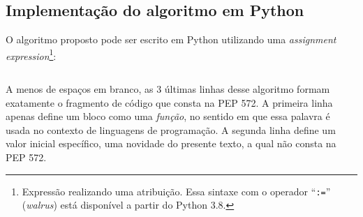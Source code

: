 \subsection*{Implementação do algoritmo em Python}

O algoritmo proposto pode ser escrito em Python
utilizando uma \emph{assignment expression}\footnote{
  Expressão realizando uma atribuição.
  Essa sintaxe com o operador ``\texttt{:=}'' (\emph{walrus})
  está disponível a partir do Python 3.8.
}:

\begin{center}
  \begin{minipage}{7cm}
    \inputminted{python}{nth_root.py}
  \end{minipage}
\end{center}

A menos de espaços em branco,
as $3$ últimas linhas desse algoritmo
formam exatamente o fragmento de código que consta na PEP 572.
A primeira linha apenas define um bloco como uma \emph{função},
no sentido em que essa palavra é usada
no contexto de linguagens de programação.
A segunda linha define um valor inicial específico,
uma novidade do presente texto, a qual não consta na PEP 572.
